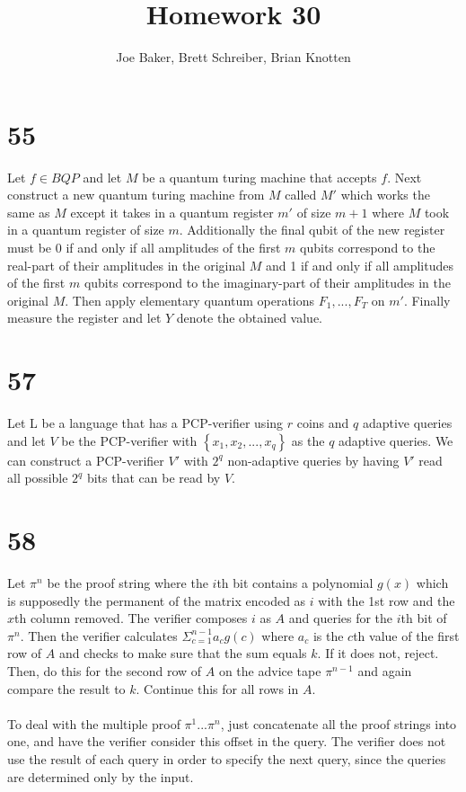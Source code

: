 \documentclass[letterpaper,notitlepage,twoside]{article}
\begin{document}
\title{Homework 30}
\author{Joe Baker, Brett Schreiber, Brian Knotten}
\maketitle

\section*{55}
Let $f \in BQP$ and let $M$ be a quantum turing machine that accepts $f$. Next construct a new quantum turing machine from $M$ called $M'$ which works the same as $M$ except it takes in a quantum register $m'$ of size $m+1$ where $M$ took in a quantum register of size $m$. Additionally the final qubit of the new register must be 0 if and only if all amplitudes of the first $m$ qubits correspond to the real-part of their amplitudes in the original $M$ and 1 if and only if all amplitudes of the first $m$ qubits correspond to the imaginary-part of their amplitudes in the original $M$. Then apply elementary quantum operations $F_1,...,F_T$ on $m'$. Finally measure the register and let $Y$ denote the obtained value.

\section*{57}
Let L be a language that has a PCP-verifier using $r$ coins and $q$ adaptive queries and let $V$ be the PCP-verifier with $\left\{x_1,x_2,...,x_q\right\}$ as the $q$ adaptive queries. We can construct a PCP-verifier $V'$ with $2^q$ non-adaptive queries by having $V'$ read all possible $2^q$ bits that can be read by $V$.

\section*{58}
Let $\pi^n$ be the proof string where the $i$th bit contains a polynomial $g(x)$ which is supposedly the permanent of the matrix encoded as $i$ with the 1st row and the $x$th column removed. The verifier composes $i$ as $A$ and queries for the $i$th bit of $\pi^n$. Then the verifier calculates $\Sigma_{c = 1}^{n - 1}a_cg(c)$ where $a_c$ is the $c$th value of the first row of $A$ and checks to make sure that the sum equals $k$. If it does not, reject. Then, do this for the second row of $A$ on the advice tape $\pi^{n - 1}$ and again compare the result to $k$. Continue this for all rows in $A$. \\\\
To deal with the multiple proof $\pi^1...\pi^n$, just concatenate all the proof strings into one, and have the verifier consider this offset in the query. The verifier does not use the result of each query in order to specify the next query, since the queries are determined only by the input.
\end{document}
